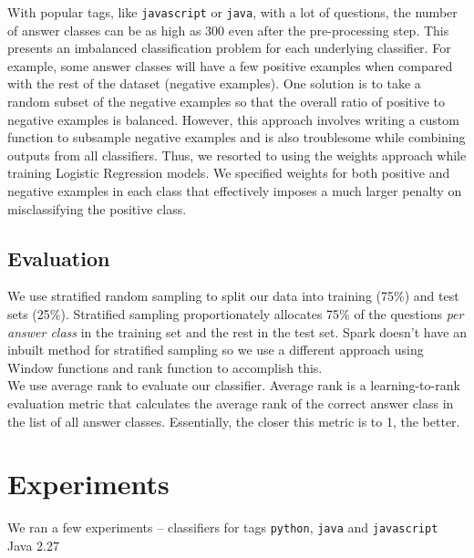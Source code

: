 \documentclass{article}
\begin{document}
With popular tags, like \texttt{javascript} or \texttt{java}, with a lot of questions, the number of answer classes can be as high as 300 even after the pre-processing step. This presents an imbalanced classification problem for each underlying classifier. For example, some answer classes will have a few positive examples when compared with the rest of the dataset (negative examples). One solution is to take a random subset of the negative examples so that the overall ratio of positive to negative examples is balanced. However, this approach involves writing a custom function to subsample negative examples and is also troublesome while combining outputs from all classifiers. Thus, we resorted to using the weights approach while training Logistic Regression models. We specified weights for both positive and negative examples in each class that effectively imposes a much larger penalty on misclassifying the positive class.

\subsection{Evaluation}
We use stratified random sampling to split our data into training (75\%) and test sets (25\%). Stratified sampling proportionately allocates 75\% of the questions \textit{per answer class} in the training set and the rest in the test set. Spark doesn't have an inbuilt method for stratified sampling so we use a different approach using Window functions and rank function to accomplish this.\\

We use average rank to evaluate our classifier. Average rank is a learning-to-rank evaluation metric that calculates the average rank of the correct answer class in the list of all answer classes. Essentially, the closer this metric is to 1, the better.

\section{Experiments}
We ran a few experiments -- classifiers for tags \texttt{python}, \texttt{java} and \texttt{javascript}
Java 2.27
\end{document}
